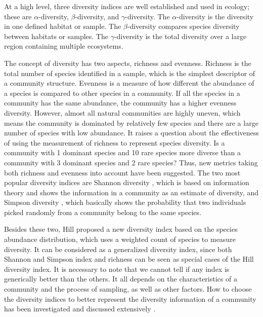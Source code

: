 At a high level, three diversity indices are well established and used in
ecology; these are $\alpha$-diversity, $\beta$-diversity, and
$\gamma$-diversity. The $\alpha$-diversity is the diversity in one defined habitat
or sample. The $\beta$-diversity compares species diversity between habitats or
samples. The $\gamma$-diversity is the total diversity over a large region
containing multiple ecosystems\cite{magurran2011biological}.

The concept of diversity has two aspects, richness and evenness. Richness is
the total number of species identified in a sample, which is the simplest
descriptor of a community structure. Evenness is a measure of how different the
abundance of a species is compared to other species in a community. If all the
species in a community has the same abundance, the community has a higher
evenness diversity. However, almost all natural communities are highly uneven,
which means the community is dominated by relatively few species and there are
a large number of species with low abundance. It raises a question about the
effectiveness of using the measurement of richness to represent species
diversity. Is a community with 1 dominant species and 10 rare species more
diverse than a community with 3 dominant species and 2 rare species? Thus, new
metrics taking both richness and evenness into account have been suggested. The two
most popular diversity indices are Shannon diversity
\cite{shannon2001mathematical}, which is based on information theory and shows
the information in a community as an estimate of diversity, and Simpson
diversity \cite{simpson1949measurement}, which basically shows the probability
that two individuals picked randomly from a community belong to the same
species.

Besides these two, Hill \cite{hill1973diversity} proposed a new diversity index
based on the species abundance distribution, which uses a weighted count of
species to measure diversity. It can be considered as a generalized diversity
index, since both Shannon and Simpson index and richness can be seen as special
cases of the Hill diversity index. It is necessary to note that we cannot tell
if any index is generically better than the others. It all depends on the
characteristics of a community and the process of sampling, as well as other
factors. How to choose the diversity indices to better represent the 
diversity information of a community has been investigated and discussed extensively 
\cite{Bohannan2003,Haegeman:2013aa,Morris2014}.

